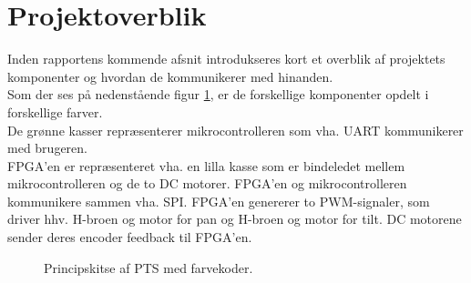 \section{Projektoverblik}
\label{sec:projektoverblik}
Inden rapportens kommende afsnit introdukseres kort et overblik af projektets komponenter og hvordan de kommunikerer med hinanden.\\
Som der ses på nedenstående figur \ref{fig:overview_openloop_PTS}, er de forskellige komponenter opdelt i forskellige farver.\\
De grønne kasser repræsenterer mikrocontrolleren som vha. UART kommunikerer med brugeren. \\
FPGA'en er repræsenteret vha. en lilla kasse som er bindeledet mellem mikrocontrolleren og de to DC motorer. FPGA'en og mikrocontrolleren kommunikere sammen vha. SPI. FPGA'en genererer to PWM-signaler, som driver hhv. H-broen og motor for pan og H-broen og motor for tilt. DC motorene sender deres encoder feedback til FPGA'en.
\begin{figure}[!th]
\centering
\begin{tikzpicture}[auto, node distance=1cm,>=latex']

\end{tikzpicture}
\caption[Principskitse af PTS]{Principskitse af PTS med farvekoder.}
\label{fig:overview_openloop_PTS}
\end{figure}